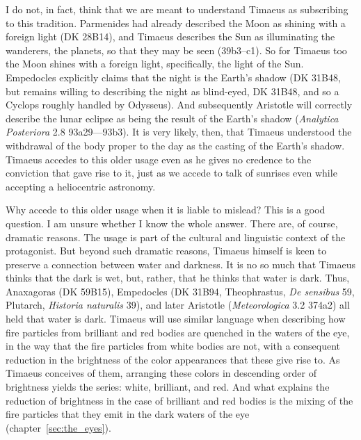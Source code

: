 I do not, in fact, think that we are meant to understand Timaeus as subscribing to this tradition. Parmenides had already described the Moon as shining with a foreign light (DK 28B14), and Timaeus describes the Sun as illuminating the wanderers, the planets, so that they may be seen (39b3--c1). So for Timaeus too the Moon shines with a foreign light, specifically, the light of the Sun. Empedocles explicitly claims that the night is the Earth's shadow (DK 31B48, but remains willing to describing the night as blind-eyed, DK 31B48, and so a Cyclops roughly handled by Odysseus). And subsequently Aristotle will correctly describe the lunar eclipse as being the result of the Earth's shadow (\emph{Analytica Posteriora} 2.8 93a29—93b3). It is very likely, then, that Timaeus understood the withdrawal of the body proper to the day as the casting of the Earth's shadow. Timaeus accedes to this older usage even as he gives no credence to the conviction that gave rise to it, just as we accede to talk of sunrises even while accepting a heliocentric astronomy. 

Why accede to this older usage when it is liable to mislead? This is a good question. I am unsure whether I know the whole answer. There are, of course, dramatic reasons. The usage is part of the cultural and linguistic context of the protagonist. But beyond such dramatic reasons, Timaeus himself is keen to preserve a connection between water and darkness. It is no so much that Timaeus thinks that the dark is wet, but, rather, that he thinks that water is dark. Thus, Anaxagoras (DK 59B15), Empedocles (DK 31B94, Theophrastus, \emph{De sensibus} 59, Plutarch, \emph{Historia naturalis} 39), and later Aristotle (\emph{Meteorologica} 3.2 374a2) all held that water is dark. Timaeus will use similar language when describing how fire particles from brilliant and red bodies are quenched in the waters of the eye, in the way that the fire particles from white bodies are not, with a consequent reduction in the brightness of the color appearances that these give rise to. As Timaeus conceives of them, arranging these colors in descending order of brightness yields the series: white, brilliant, and red. And what explains the reduction of brightness in the case of brilliant and red bodies is the mixing of the fire particles that they emit in the dark waters of the eye (chapter~\ref{sec:the_eyes}). 

